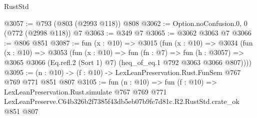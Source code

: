 \begin{lexlean}{RustStd}
\begin{coremodule}
@3057 := @793 (@803 (@2993 @118)) @808
@3062 := Option.noConfusion.{0, 0} (@772 (@2998 @118)) @7
@3063 := @349 @7
@3065 := @3062 @3063 @7
@3066 := @806 @851
@3087 := fun (x : @10) =>
  @3015
    (fun (x : @10) =>
    @3034
      (fun (x : @10) =>
      @3053
        (fun (x : @10) =>
        fun (fn : @7) =>
        fun (h : @3057) =>
        @3065 @3066 (Eq.refl.{2} (Sort 1) @7) (heq_of_eq.{1} @792 @3063 @3066 @807))))
@3095 := (n : @10) -> (f : @10) -> LexLeanPreservation.Rust.FunSem @767 @769 @771 @851 @807
@3105 := fun (n : @10) =>
  fun (f : @10) =>
  LexLeanPreservation.Rust.simulate
    @767
    @769
    @771
    LexLeanPreserve.C64b326b2f7385f43db5eb07b9fc7d81c.R2.RustStd.crate_ok
    @851
    @807
\end{coremodule}
\end{lexlean}
